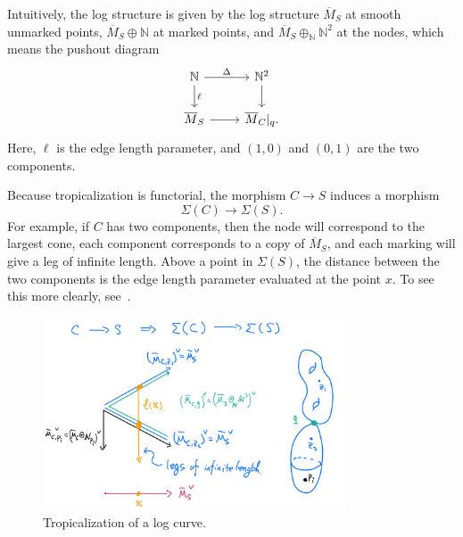 \documentclass[10pt]{amsart}
\theoremstyle{definition}
\theoremstyle{remark}
\theoremstyle{plain}
\theoremstyle{definition}
\theoremstyle{remark}
\newcommand{\N}{\mathbb{N}}
\newcommand{\ol}[1]{\overline{#1}}
\newcommand{\1}{\mathbf{1}}
\newcommand{\2}{\mathbf{2}}
\newcommand{\3}{\mathbf{3}}
\begin{document}
Intuitively, the log structure is given by the log structure $\ol{M}_S$ at smooth unmarked points, $\ol{M}_S \oplus \N$ at marked points, and $\ol{M}_S \oplus_{\N} \N^2$ at the nodes, which means the pushout diagram
\begin{equation*}
\begin{tikzcd}
    \N \ar{r}{\Delta} \ar{d}{\ell} & \N^2 \ar{d} \\
    \ol{M}_S \ar{r} & \ol{M}_C|_q.
\end{tikzcd}
\end{equation*}
Here, $\ell$ is the edge length parameter, and $(1,0)$ and $(0,1)$ are the two components.

Because tropicalization is functorial, the morphism $C \to S$ induces a morphism
\[ \Sigma(C) \to \Sigma(S). \]
For example, if $C$ has two components, then the node will correspond to the largest cone, each component corresponds to a copy of $\ol{M}_S$, and each marking will give a leg of infinite length. Above a point in $\Sigma(S)$, the distance between the two components is the edge length parameter evaluated at the point $x$. To see this more clearly, see~.
\begin{figure}[htpb]
    \centering
    \includegraphics[width=0.8\textwidth]{tropcurve.png}
    \caption{Tropicalization of a log curve.}
    \label{fig:tropcurve-png}
\end{figure}
\end{document}
